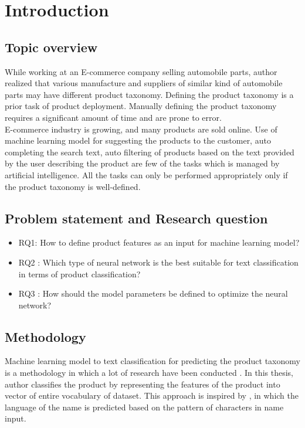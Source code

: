 \chapter{Introduction}

\section{Topic overview}

While working at an E-commerce company selling automobile parts, author realized that various manufacture and suppliers of similar kind of automobile parts may have different product taxonomy. Defining the product taxonomy is a prior task of product deployment. Manually defining the product taxonomy requires a significant amount of time and are prone to error. \\

E-commerce industry is growing, and many products are sold online. Use of machine learning model for suggesting the products to the customer, auto completing the search text, auto filtering of products based on the text provided by the user describing the product are few of the tasks which is managed by artificial intelligence. All the tasks can only be performed appropriately only if the product taxonomy is well-defined. \\

 

\section{Problem statement and Research question}

\begin{itemize}
    \item RQ1: How to define product features as an input for machine learning model?
    \item RQ2 : Which type of neural network is the best suitable for text classification in terms of product classification?
    \item RQ3 :  How should the model parameters be defined to optimize the neural network?
\end{itemize}

\section{Methodology}

Machine learning model to text classification for predicting the product taxonomy is a methodology in which a lot of research have been conducted \parencite{AliCevahir.} \parencite{Gupta.20062016}. In this thesis, author classifies the product by representing the features of the product into vector of entire vocabulary of dataset. This approach is inspired by \parencite{sean}, in which the language of the name is predicted based on the pattern of characters in name input. 

